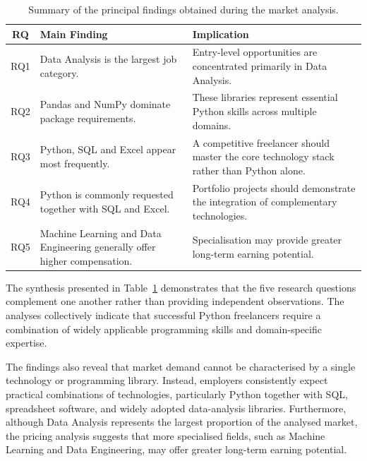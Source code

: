 \begin{table}[H]
    \centering
    \small
    \caption{Summary of the principal findings obtained during the market analysis.}
    \label{tab:market_synthesis}

    \begin{tabularx}{\textwidth}{
        c
        p{3.6cm}
        X
    }
        \toprule
        \textbf{RQ} &
        \textbf{Main Finding} &
        \textbf{Implication} \\
        \midrule

        RQ1 &
        Data Analysis is the largest job category. &
        Entry-level opportunities are concentrated primarily in Data Analysis. \\

        RQ2 &
        Pandas and NumPy dominate package requirements. &
        These libraries represent essential Python skills across multiple domains. \\

        RQ3 &
        Python, SQL and Excel appear most frequently. &
        A competitive freelancer should master the core technology stack rather than Python alone. \\

        RQ4 &
        Python is commonly requested together with SQL and Excel. &
        Portfolio projects should demonstrate the integration of complementary technologies. \\

        RQ5 &
        Machine Learning and Data Engineering generally offer higher compensation. &
        Specialisation may provide greater long-term earning potential. \\

        \bottomrule
    \end{tabularx}
\end{table}

The synthesis presented in Table~\ref{tab:market_synthesis} demonstrates that the five research questions complement one another rather than providing
independent observations. The analyses collectively indicate that successful Python freelancers require a combination of widely applicable programming
skills and domain-specific expertise.

The findings also reveal that market demand cannot be characterised by a single technology or programming library. Instead, employers consistently
expect practical combinations of technologies, particularly Python together with SQL, spreadsheet software, and widely adopted data-analysis libraries.
Furthermore, although Data Analysis represents the largest proportion of the analysed market, the pricing analysis suggests that more specialised fields,
such as Machine Learning and Data Engineering, may offer greater long-term earning potential.

